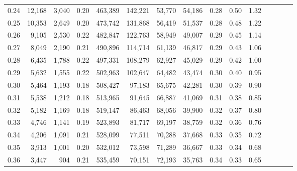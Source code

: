\begin{tabular}{rrrcrrrrrrrrrrr}
0.24 &  12,168 &  3,040 &                                       0.20 &  463,389 &  142,221 &   53,770 &   54,186 &  0.28 &  0.50 &                         1.32 \\
0.25 &  10,353 &  2,649 &                                       0.20 &  473,742 &  131,868 &   56,419 &   51,537 &  0.28 &  0.48 &                         1.22 \\
0.26 &   9,105 &  2,530 &                                       0.22 &  482,847 &  122,763 &   58,949 &   49,007 &  0.29 &  0.45 &                         1.14 \\
0.27 &   8,049 &  2,190 &                                       0.21 &  490,896 &  114,714 &   61,139 &   46,817 &  0.29 &  0.43 &                         1.06 \\
0.28 &   6,435 &  1,788 &                                       0.22 &  497,331 &  108,279 &   62,927 &   45,029 &  0.29 &  0.42 &                         1.00 \\
0.29 &   5,632 &  1,555 &                                       0.22 &  502,963 &  102,647 &   64,482 &   43,474 &  0.30 &  0.40 &                         0.95 \\
0.30 &   5,464 &  1,193 &                                       0.18 &  508,427 &   97,183 &   65,675 &   42,281 &  0.30 &  0.39 &                         0.90 \\
0.31 &   5,538 &  1,212 &                                       0.18 &  513,965 &   91,645 &   66,887 &   41,069 &  0.31 &  0.38 &                         0.85 \\
0.32 &   5,182 &  1,169 &                                       0.18 &  519,147 &   86,463 &   68,056 &   39,900 &  0.32 &  0.37 &                         0.80 \\
0.33 &   4,746 &  1,141 &                                       0.19 &  523,893 &   81,717 &   69,197 &   38,759 &  0.32 &  0.36 &                         0.76 \\
0.34 &   4,206 &  1,091 &                                       0.21 &  528,099 &   77,511 &   70,288 &   37,668 &  0.33 &  0.35 &                         0.72 \\
0.35 &   3,913 &  1,001 &                                       0.20 &  532,012 &   73,598 &   71,289 &   36,667 &  0.33 &  0.34 &                         0.68 \\
0.36 &   3,447 &    904 &                                       0.21 &  535,459 &   70,151 &   72,193 &   35,763 &  0.34 &  0.33 &                         0.65 \\

\end{tabular}
